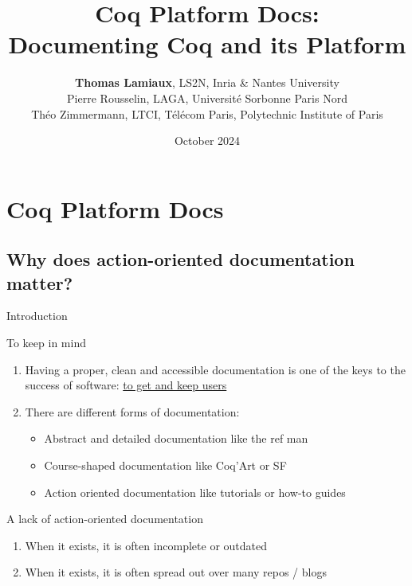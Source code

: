 \documentclass[10pt]{beamer}
\title{Coq Platform Docs: \\ Documenting Coq and its Platform}
\author{\textbf{Thomas Lamiaux}, LS2N, Inria \& Nantes University \\
Pierre Rousselin, LAGA, Université Sorbonne Paris Nord \\
Théo Zimmermann, LTCI, Télécom Paris, Polytechnic Institute of Paris }
\date{October 2024}
\begin{document}
\begin{frame}
    \maketitle
\end{frame}


\section*{Coq Platform Docs}

\subsection{Why does action-oriented documentation matter?}

\begin{frame}{Introduction}
  \begin{tcbProp}{To keep in mind}
    \begin{enumerate}
      \item Having a proper, clean and accessible documentation is one of the
            keys to the success of software: \ul{to get and keep users}
      \item<2-> There are different forms of documentation:
      \begin{itemize}[label=$-$]
        \item Abstract and detailed documentation like the ref man
        \item Course-shaped documentation like Coq'Art or SF
        \item Action oriented documentation like tutorials or how-to guides
      \end{itemize}
    \end{enumerate}
  \end{tcbProp}
  \begin{tcbPbl}{A lack of action-oriented documentation }
    \begin{enumerate}
      \item<3-> When it exists, it is often incomplete or outdated
      \item<4-> When it exists, it is often spread out over many repos / blogs
    \end{enumerate}
  \end{tcbPbl}
\end{frame}
\end{document}
